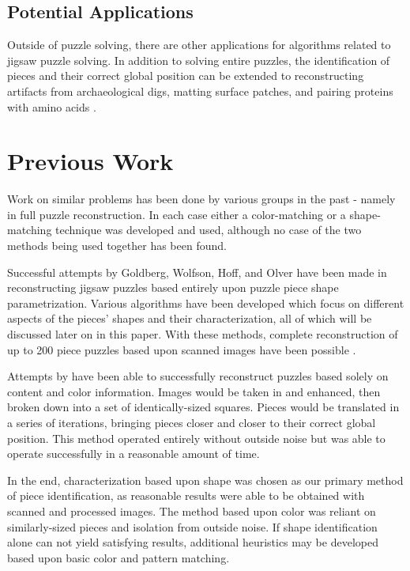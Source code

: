 \documentclass[12pt]{report}
\begin{document}
\subsection*{Potential Applications}
Outside of puzzle solving, there are other applications for algorithms related to jigsaw puzzle solving. In addition to solving entire puzzles, the identification of pieces and their correct global position can be extended to reconstructing artifacts from archaeological digs, matting surface patches, and pairing proteins with amino acids \cite{goldberg}. 


\section*{Previous Work}
Work on similar problems has been done by various groups in the past - namely in full puzzle reconstruction. In each case either a color-matching or a shape-matching technique was developed and used, although no case of the two methods being used together has been found.

Successful attempts by Goldberg, Wolfson, Hoff, and Olver have been made in reconstructing jigsaw puzzles based entirely upon puzzle piece shape parametrization. Various algorithms have been developed which focus on different aspects of the pieces' shapes and their characterization, all of which will be discussed later on in this paper. With these methods, complete reconstruction of up to 200 piece puzzles based upon scanned images have been possible \cite{goldberg,wolfson}.

Attempts by \citeauthor{sholomon} \cite{sholomon} have been able to successfully reconstruct puzzles based solely on content and color information. Images would be taken in and enhanced, then broken down into a set of identically-sized squares. Pieces would be translated in a series of iterations, bringing pieces closer and closer to their correct global position. This method operated entirely without outside noise but was able to operate successfully in a reasonable amount of time.

In the end, characterization based upon shape was chosen as our primary method of piece identification, as reasonable results were able to be obtained with scanned and processed images. The method based upon color was reliant on similarly-sized pieces and isolation from outside noise. If shape identification alone can not yield satisfying results, additional heuristics may be developed based upon basic color and pattern matching.
\end{document}

